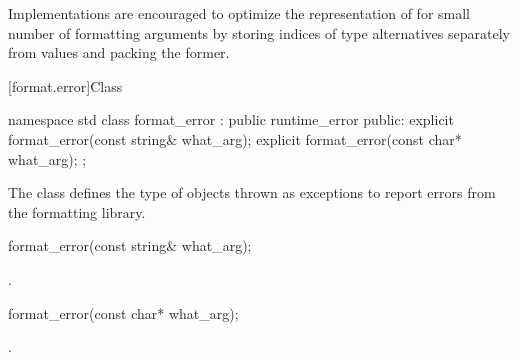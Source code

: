 \begin{note}
Implementations are encouraged
to optimize the representation of 
for small number of formatting arguments
by storing indices of type alternatives separately from values
and packing the former.
\end{note}

[format.error]{Class }

%
\begin{codeblock}
namespace std {
  class format_error : public runtime_error {
  public:
    explicit format_error(const string& what_arg);
    explicit format_error(const char* what_arg);
  };
}
\end{codeblock}

\pnum
The class  defines the type of objects thrown as
exceptions to report errors from the formatting library.

%
\begin{itemdecl}
format_error(const string& what_arg);
\end{itemdecl}

\begin{itemdescr}
\pnum
\ensures
{}.

%
\end{itemdescr}
\begin{itemdecl}
format_error(const char* what_arg);
\end{itemdecl}

\begin{itemdescr}
\pnum
\ensures
{}.
\end{itemdescr}
